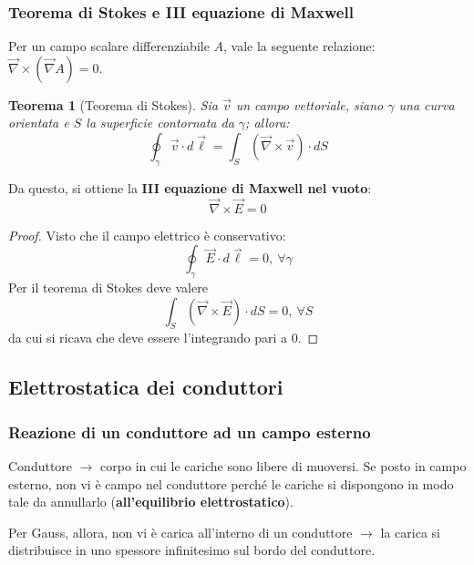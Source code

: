 \documentclass[10pt, a4paper]{scrartcl}
\numberwithin{equation}{subsection}
\theoremstyle{style1}
\newtheorem{teorema}{Teorema}[section]
\newenvironment{boxenv}[1][]{
    \begin{eqbox}[#1]
    }{
   \end{eqbox}
}
\begin{document}
\subsubsection{Teorema di Stokes e III equazione di Maxwell}
Per un campo scalare differenziabile $A$, vale la seguente relazione: $\vec{\nabla }\times (\vec{\nabla }A) = 0$.
\begin{teorema}
	[Teorema di Stokes]
	Sia $\vec{v}$ un campo vettoriale, siano $\gamma$ una curva orientata e $S$ la superficie contornata da $\gamma$; allora:
	\begin{equation}
		\oint_{\gamma} \vec{v}\cdot d\vec{\ell } = \int_{S}  (\vec{\nabla }\times \vec{v}) \cdot  dS
	\end{equation}
\end{teorema}
\noindent Da questo, si ottiene la \textbf{III equazione di Maxwell nel vuoto}:
\begin{equation}
	\vec{\nabla }\times \vec{E} = 0
\end{equation}
\begin{boxenv}[]
\begin{proof}
	Visto che il campo elettrico \`e conservativo:
	\[
	\oint_{\gamma} \vec{E}\cdot d\vec{\ell } = 0, \ \forall \gamma
	\] 
	Per il teorema di Stokes deve valere
	\[
	\int_{S}  (\vec{\nabla }\times \vec{E}) \cdot  dS = 0, \ \forall S
	\] 
	da cui si ricava che deve essere l'integrando pari a $0$.
\end{proof}
\end{boxenv}
\subsection{Elettrostatica dei conduttori}
\subsubsection{Reazione di un conduttore ad un campo esterno}


Conduttore $\to$ corpo in cui le cariche sono libere di muoversi. Se posto in campo esterno, non vi \`e campo nel conduttore perch\'e le cariche si dispongono in modo tale da annullarlo (\textbf{all'equilibrio elettrostatico}).

Per Gauss, allora, non vi \`e carica all'interno di un conduttore $\to$ la carica si distribuisce in uno spessore infinitesimo sul bordo del conduttore.
\end{document}
